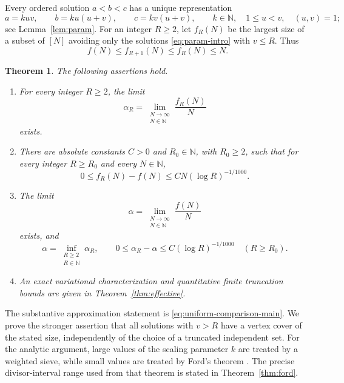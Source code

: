 \documentclass[11pt]{article}
\newtheorem{theorem}{Theorem}[section]
\theoremstyle{definition}
\theoremstyle{remark}
\numberwithin{equation}{section}
\newcommand{\N}{\mathbb N}
\begin{document}
Every ordered solution \(a<b<c\) has a unique representation
\begin{equation}\label{eq:param-intro}
 a=kuv,\qquad b=ku(u+v),\qquad c=kv(u+v),
 \qquad k\in\N,\quad 1\le u<v,\quad (u,v)=1;
\end{equation}
see Lemma~\ref{lem:param}. For an integer \(R\ge2\), let \(f_R(N)\)
be the largest size of a subset of \([N]\) avoiding only the
solutions \eqref{eq:param-intro} with \(v\le R\). Thus
\[
 f(N)\le f_{R+1}(N)\le f_R(N)\le N.
\]

\begin{theorem}\label{thm:main}
The following assertions hold.
\begin{enumerate}
\item For every integer \(R\ge2\), the limit
\[
 \alpha_R=\lim_{\substack{N\to\infty\\N\in\N}}\frac{f_R(N)}N
\]
exists.
\item There are absolute constants \(C>0\) and
\(R_0\in\N\), with \(R_0\ge2\), such that for every integer
\(R\ge R_0\) and every \(N\in\N\),
\begin{equation}\label{eq:uniform-comparison-main}
 0\le f_R(N)-f(N)\le CN(\log R)^{-1/1000}.
\end{equation}
\item The limit
\[
 \alpha=\lim_{\substack{N\to\infty\\N\in\N}}\frac{f(N)}N
\]
exists, and
\begin{equation}\label{eq:alpha-inf-main}
 \alpha=\inf_{\substack{R\ge2\\R\in\N}}\alpha_R,
 \qquad
 0\le\alpha_R-\alpha\le C(\log R)^{-1/1000}
 \quad(R\ge R_0).
\end{equation}
\item An exact variational characterization and quantitative finite
truncation bounds are given in Theorem~\ref{thm:effective}.
\end{enumerate}
\end{theorem}


The substantive approximation statement is
\eqref{eq:uniform-comparison-main}. We prove the stronger assertion
that all solutions with \(v>R\) have a vertex cover of the stated
size, independently of the choice of a truncated independent set.
For the analytic argument, large values of the scaling parameter
\(k\) are treated by a weighted sieve, while small values are treated
by Ford's theorem \cite[Theorem~1]{Ford2008}. The precise
divisor-interval range used from that theorem is stated in
Theorem~\ref{thm:ford}.
\end{document}
